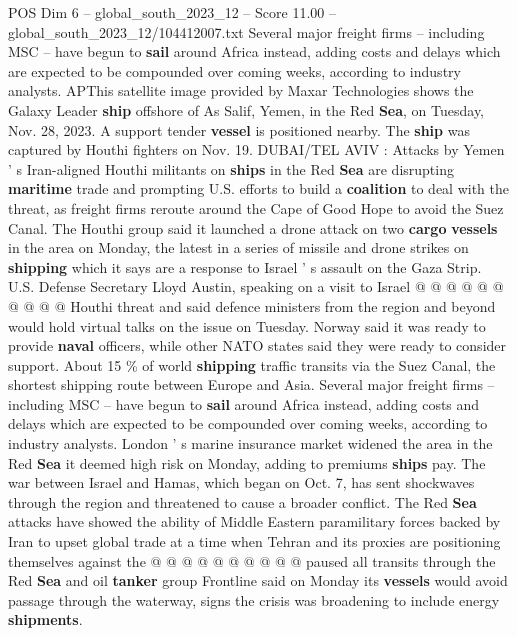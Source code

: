 \begin{textsample}{POS Dim 6 – global\_south\_2023\_12 – Score 11.00 – global\_south\_2023\_12/104412007.txt}  \label{ex:f6_pos_103}
Several major freight firms -- including MSC -- have begun to \textbf{sail} around Africa instead, adding costs and delays which are expected to be compounded over coming weeks, according to industry analysts.
APThis satellite image provided by Maxar Technologies shows the Galaxy Leader \textbf{ship} offshore of As Salif, Yemen, in the Red \textbf{Sea}, on Tuesday, Nov. 28, 2023.
A support tender \textbf{vessel} is positioned nearby.
The \textbf{ship} was captured by Houthi fighters on Nov. 19.
DUBAI/TEL AVIV : Attacks by Yemen ' s Iran-aligned Houthi militants on \textbf{ships} in the Red \textbf{Sea} are disrupting \textbf{maritime} trade and prompting U.S. efforts to build a \textbf{coalition} to deal with the threat, as freight firms reroute around the Cape of Good Hope to avoid the Suez Canal.
The Houthi group said it launched a drone attack on two \textbf{cargo} \textbf{vessels} in the area on Monday, the latest in a series of missile and drone strikes on \textbf{shipping} which it says are a response to Israel ' s assault on the Gaza Strip.
U.S.
Defense Secretary Lloyd Austin, speaking on a visit to Israel @ @ @ @ @ @ @ @ @ @ Houthi threat and said defence ministers from the region and beyond would hold virtual talks on the issue on Tuesday.
Norway said it was ready to provide \textbf{naval} officers, while other NATO states said they were ready to consider support.
About 15 \% of world \textbf{shipping} traffic transits via the Suez Canal, the shortest shipping route between Europe and Asia.
Several major freight firms -- including MSC -- have begun to \textbf{sail} around Africa instead, adding costs and delays which are expected to be compounded over coming weeks, according to industry analysts.
London ' s marine insurance market widened the area in the Red \textbf{Sea} it deemed high risk on Monday, adding to premiums \textbf{ships} pay.
The war between Israel and Hamas, which began on Oct. 7, has sent shockwaves through the region and threatened to cause a broader conflict.
The Red \textbf{Sea} attacks have showed the ability of Middle Eastern paramilitary forces backed by Iran to upset global trade at a time when Tehran and its proxies are positioning themselves against the @ @ @ @ @ @ @ @ @ @ paused all transits through the Red \textbf{Sea} and oil \textbf{tanker} group Frontline said on Monday its \textbf{vessels} would avoid passage through the waterway, signs the crisis was broadening to include energy \textbf{shipments}.

\end{textsample}
